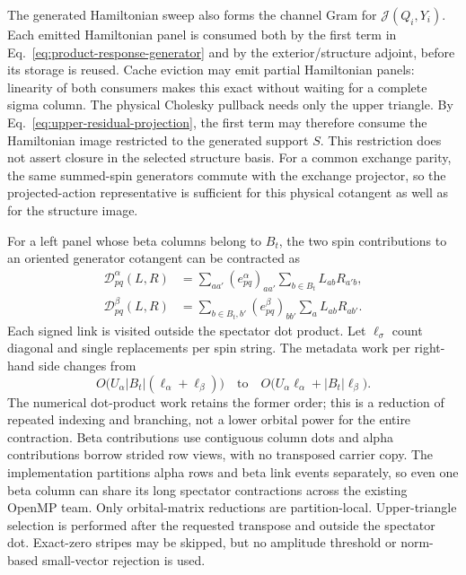 \documentclass[11pt,a4paper]{article}
\begin{document}
The generated Hamiltonian sweep also forms the channel Gram for
$\mathcal J(Q_i,Y_i)$. Each emitted Hamiltonian panel is consumed both by
the first term in Eq.~\eqref{eq:product-response-generator} and by the
exterior/structure adjoint, before its storage is reused. Cache eviction
may emit partial Hamiltonian panels: linearity of both consumers makes
this exact without waiting for a complete sigma column. The physical
Cholesky pullback needs only the upper triangle. By
Eq.~\eqref{eq:upper-residual-projection}, the first term may therefore
consume the Hamiltonian image restricted to the generated support $S$.
This restriction does not assert closure in the selected structure basis.
For a common exchange parity, the same summed-spin generators commute with
the exchange projector, so the projected-action representative is sufficient
for this physical cotangent as well as for the structure image.

For a left panel whose beta columns belong to $B_t$, the two spin contributions
to an oriented generator cotangent can be contracted as
\begin{align}
 \mathcal D^\alpha_{pq}(L,R)&=
  \sum_{aa'}(e^\alpha_{pq})_{aa'}
        \sum_{b\in B_t}L_{ab}R_{a'b},\\
 \mathcal D^\beta_{pq}(L,R)&=
  \sum_{b\in B_t,b'}(e^\beta_{pq})_{bb'}
        \sum_aL_{ab}R_{ab'}.
 \label{eq:spectator-first-generator}
\end{align}
Each signed link is visited outside the spectator dot product.
Let $\ell_\sigma$ count diagonal and single replacements per spin string.
The metadata work per right-hand side changes from
\[
 O\bigl(U_\alpha |B_t|(\ell_\alpha+\ell_\beta)\bigr)
 \quad\text{to}\quad
 O\bigl(U_\alpha\ell_\alpha+|B_t|\ell_\beta\bigr).
\]
The numerical dot-product work retains the former order; this is a reduction
of repeated indexing and branching, not a lower orbital power for the entire
contraction. Beta contributions use contiguous column dots and alpha
contributions borrow strided row views, with no transposed carrier copy.
The implementation partitions alpha rows and beta link events separately,
so even one beta column can share its long spectator contractions across
the existing OpenMP team. Only orbital-matrix reductions are partition-local.
Upper-triangle selection is performed after the requested transpose and
outside the spectator dot. Exact-zero stripes may be skipped, but no
amplitude threshold or norm-based small-vector rejection is used.
\end{document}
